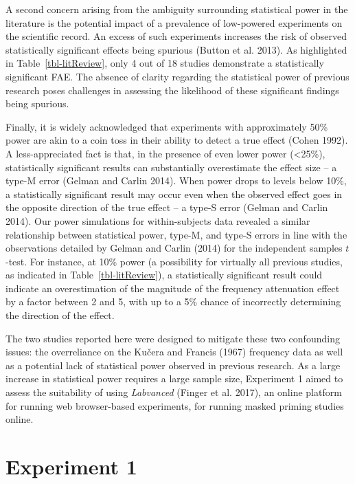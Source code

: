 \documentclass[
]{interact}
\begin{document}
A second concern arising from the ambiguity surrounding statistical
power in the literature is the potential impact of a prevalence of
low-powered experiments on the scientific record. An excess of such
experiments increases the risk of observed statistically significant
effects being spurious (Button et al. 2013). As highlighted in
Table~\ref{tbl-litReview}, only 4 out of 18 studies demonstrate a
statistically significant FAE. The absence of clarity regarding the
statistical power of previous research poses challenges in assessing the
likelihood of these significant findings being spurious.

Finally, it is widely acknowledged that experiments with approximately
50\% power are akin to a coin toss in their ability to detect a true
effect (Cohen 1992). A less-appreciated fact is that, in the presence of
even lower power (\textless25\%), statistically significant results can
substantially overestimate the effect size -- a type-M error (Gelman and
Carlin 2014). When power drops to levels below 10\%, a statistically
significant result may occur even when the observed effect goes in the
opposite direction of the true effect -- a type-S error (Gelman and
Carlin 2014). Our power simulations for within-subjects data revealed a
similar relationship between statistical power, type-M, and type-S
errors in line with the observations detailed by Gelman and Carlin
(2014) for the independent samples \(t\)-test. For instance, at 10\%
power (a possibility for virtually all previous studies, as indicated in
Table~\ref{tbl-litReview}), a statistically significant result could
indicate an overestimation of the magnitude of the frequency attenuation
effect by a factor between 2 and 5, with up to a 5\% chance of
incorrectly determining the direction of the effect.

The two studies reported here were designed to mitigate these two
confounding issues: the overreliance on the Kučera and Francis (1967)
frequency data as well as a potential lack of statistical power observed
in previous research. As a large increase in statistical power requires
a large sample size, Experiment 1 aimed to assess the suitability of
using \emph{Labvanced} (Finger et al. 2017), an online platform for
running web browser-based experiments, for running masked priming
studies online.

\section{Experiment 1}\label{sec-exp1}
\end{document}
